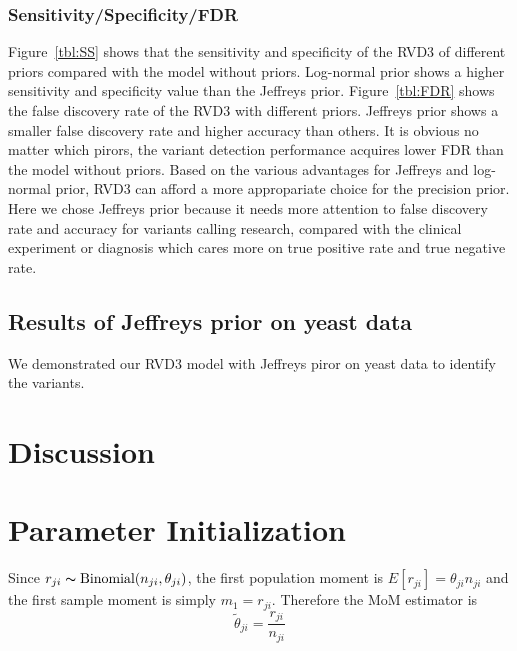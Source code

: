 \documentclass[11pt,reqno]{amsart}
\begin{document}
\subsubsection{Sensitivity/Specificity/FDR}

Figure~\ref{tbl:SS} shows that the sensitivity and specificity of the RVD3 of different priors compared with the model without priors. Log-normal prior shows a higher sensitivity and specificity value than the Jeffreys prior.
Figure~\ref{tbl:FDR} shows the false discovery rate of the RVD3 with different priors. Jeffreys prior shows a smaller false discovery rate and higher accuracy than others. It is obvious no matter which pirors, the variant detection performance acquires lower FDR than the model without priors. Based on the various advantages for Jeffreys and log-normal prior, RVD3 can afford a more appropariate choice for the precision prior. Here we chose Jeffreys prior because it needs more attention to false discovery rate and accuracy for variants calling research, compared with the clinical experiment or diagnosis which cares more on true positive rate and true negative rate.
\subsection{Results of Jeffreys prior on yeast data}

We demonstrated our RVD3 model with Jeffreys piror on yeast data to identify the variants.


\section{Discussion}


\appendix

\section{Parameter Initialization}\label{sec:appendix_mom}
Since $r_{ji} \thicksim \text{Binomial}(n_{ji}, \theta_{ji})$, the first population moment is  $E[r_{ji}] = \theta_{ji} n_{ji}$ and the first sample moment is simply $m_1 = r_{ji}$. Therefore the MoM estimator is
\begin{equation}
	\tilde{\theta}_{ji} = \frac{r_{ji}} {n_{ji}}
\end{equation}
\end{document}
